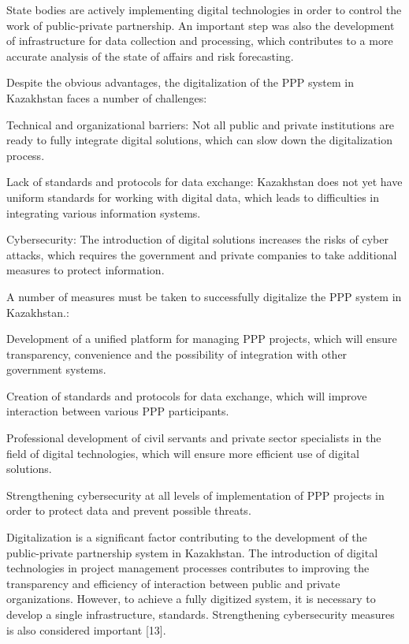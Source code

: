 \begin{multicols}{2}
State bodies are actively implementing digital technologies in order to
control the work of public-private partnership. An important step was
also the development of infrastructure for data collection and
processing, which contributes to a more accurate analysis of the state
of affairs and risk forecasting.

Despite the obvious advantages, the digitalization of the PPP system in
Kazakhstan faces a number of challenges:

Technical and organizational barriers: Not all public and private
institutions are ready to fully integrate digital solutions, which can
slow down the digitalization process.

Lack of standards and protocols for data exchange: Kazakhstan does not
yet have uniform standards for working with digital data, which leads to
difficulties in integrating various information systems.

Cybersecurity: The introduction of digital solutions increases the risks
of cyber attacks, which requires the government and private companies to
take additional measures to protect information.

A number of measures must be taken to successfully digitalize the PPP
system in Kazakhstan.:

Development of a unified platform for managing PPP projects, which will
ensure transparency, convenience and the possibility of integration with
other government systems.

Creation of standards and protocols for data exchange, which will
improve interaction between various PPP participants.

Professional development of civil servants and private sector
specialists in the field of digital technologies, which will ensure more
efficient use of digital solutions.

Strengthening cybersecurity at all levels of implementation of PPP
projects in order to protect data and prevent possible threats.

Digitalization is a significant factor contributing to the development
of the public-private partnership system in Kazakhstan. The introduction
of digital technologies in project management processes contributes to
improving the transparency and efficiency of interaction between public
and private organizations. However, to achieve a fully digitized system,
it is necessary to develop a single infrastructure, standards.
Strengthening cybersecurity measures is also considered important
{[}13{]}.
\end{multicols}

